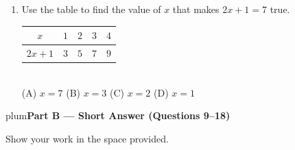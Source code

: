 \documentclass[10pt]{article}
\newcommand{\parthead}[1]{%
  \vspace{6pt}\noindent
  \begin{headlinebox}{plum}{\color{white}\bfseries #1}\end{headlinebox}%
  \vspace{4pt}}
\begin{document}
\begin{enumerate}[leftmargin=1.9em, itemsep=12pt]
  \item Use the table to find the value of $x$ that makes $2x + 1 = 7$ true.
    \quad
    \renewcommand{\arraystretch}{1.2}
    \begin{tabular}{|c|c|c|c|c|}
    \hline
    $x$      & $1$ & $2$ & $3$ & $4$ \\ \hline
    $2x + 1$ & $3$ & $5$ & $7$ & $9$ \\ \hline
    \end{tabular}
    \\[4pt]\hspace*{1em}
    (A) $x = 7$ \quad (B) $x = 3$ \quad (C) $x = 2$ \quad (D) $x = 1$
    \hfill {}\gradedblank[id=a8, type=choice, points=1, answer=B]{1.1cm}{13pt}\vphantom{\blank{0pt}}

\end{enumerate}

\boxguard[20]
\parthead{Part B --- Short Answer (Questions 9--18)}
Show your work in the space provided.
\end{document}
